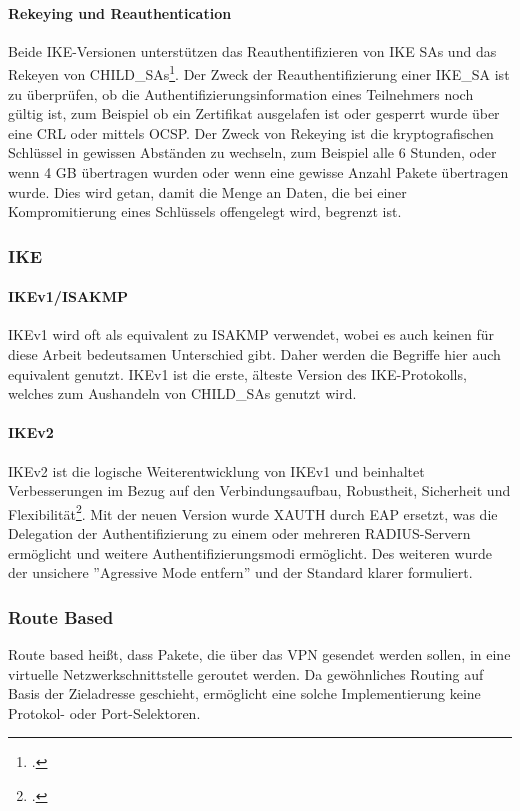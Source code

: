 \paragraph{Rekeying und Reauthentication}
Beide IKE-Versionen unterstützen das Reauthentifizieren von IKE SAs und das Rekeyen
von CHILD\_SAs\footcite[][616]{charlie_kaufman_rfc_2014}.
Der Zweck der Reauthentifizierung einer IKE\_SA ist zu überprüfen, ob die Authentifizierungsinformation
eines Teilnehmers noch gültig ist, zum Beispiel ob ein Zertifikat ausgelafen ist oder gesperrt
wurde über eine \ac{CRL} oder mittels \ac{OCSP}.
Der Zweck von Rekeying ist die kryptografischen Schlüssel in gewissen Abständen zu wechseln,
zum Beispiel alle 6 Stunden, oder wenn 4 GB übertragen wurden oder wenn eine gewisse Anzahl
Pakete übertragen wurde. Dies wird getan, damit die Menge an Daten, die bei einer Kompromitierung
eines Schlüssels offengelegt wird, begrenzt ist.

\subsubsection{IKE}
\paragraph{IKEv1/ISAKMP}
IKEv1 wird oft als equivalent zu \ac{ISAKMP} verwendet, wobei es auch keinen für diese Arbeit bedeutsamen
Unterschied gibt. Daher werden die Begriffe hier auch equivalent genutzt.
IKEv1 ist die erste, älteste Version des \ac{IKE}-Protokolls, welches zum Aushandeln
von CHILD\_SAs genutzt wird.
\paragraph{IKEv2}
IKEv2 ist die logische Weiterentwicklung von IKEv1 und beinhaltet Verbesserungen
im Bezug auf den Verbindungsaufbau, Robustheit, Sicherheit und Flexibilität\footcite[136, 137]{charlie_kaufman_rfc_2014}.
Mit der neuen Version wurde XAUTH durch \ac{EAP} ersetzt, was die Delegation der
Authentifizierung zu einem oder mehreren RADIUS-Servern ermöglicht und weitere Authentifizierungsmodi ermöglicht.
Des weiteren wurde der unsichere ''Agressive Mode entfern'' und der Standard klarer formuliert.

\subsubsection{Route Based}
\label{subsec:routebased}
Route based heißt, dass Pakete, die über das VPN
gesendet werden sollen, in eine virtuelle Netzwerkschnittstelle geroutet werden.
Da gewöhnliches Routing auf Basis der Zieladresse geschieht, ermöglicht eine solche Implementierung
keine Protokol- oder Port-Selektoren.

